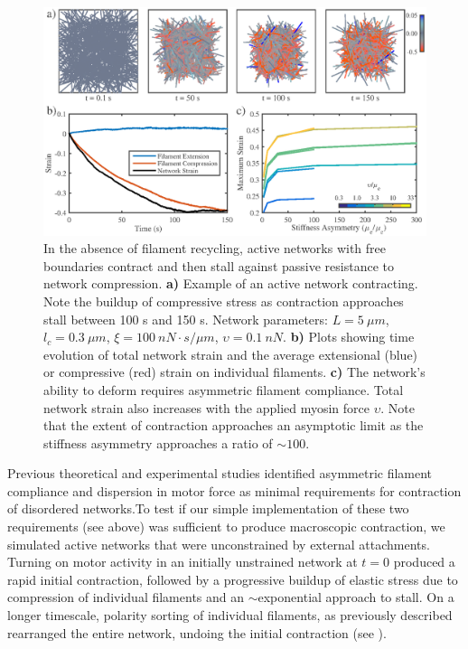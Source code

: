 \documentclass[10pt,letterpaper]{article}
\begin{document}
\begin{figure}[h!]
	\centering
	\includegraphics[width=\hsize]{figures/figure4a}
	\caption{\label{fig:active_con} In the absence of filament recycling, active networks with free boundaries contract and then stall against passive resistance to network compression. \textbf{a)}  Example of an active network contracting. Note the buildup of compressive stress as contraction approaches stall between 100 s and 150 s.  Network parameters: $L=5\: \mu m$, $l_c=0.3\: \mu m$, $\xi=100\: nN\cdot s/\mu m$, $\upsilon=0.1\: nN$.  \textbf{b)} Plots showing time evolution of total network strain and  the average extensional (blue) or compressive (red) strain on individual filaments.   \textbf{c)} The network's ability to deform requires asymmetric filament compliance.  Total network strain also increases with the applied myosin force $\upsilon$. Note that the extent of contraction approaches an asymptotic limit as the stiffness asymmetry approaches a ratio of $\sim 100$.}
\end{figure}

Previous theoretical and experimental studies\cite{1367-2630-14-3-033037,rheo_2D1,rheo_active} identified asymmetric filament compliance and dispersion in motor force  as minimal requirements for contraction of disordered networks.To test if our simple implementation of these two requirements (see above) was sufficient to produce macroscopic contraction, we simulated active networks that were unconstrained by external attachments.  Turning on motor activity in an initially unstrained network at $t=0$ produced a rapid initial contraction, followed by a progressive buildup of elastic stress due to compression of individual filaments and an $\sim$exponential approach to stall. On a longer timescale, polarity sorting of individual filaments, as previously described \cite{Ndlec:1997aa,Surrey1167} rearranged the entire network, undoing the initial contraction (see ).  
\end{document}
